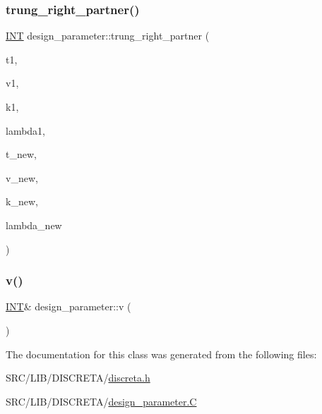 \subsubsection{\texorpdfstring{trung\+\_\+right\+\_\+partner()}{trung\_right\_partner()}}
{\footnotesize\ttfamily \mbox{\hyperlink{galois_8h_a09fddde158a3a20bd2dcadb609de11dc}{I\+NT}} design\+\_\+parameter\+::trung\+\_\+right\+\_\+partner (\begin{DoxyParamCaption}\item[{\mbox{\hyperlink{galois_8h_a09fddde158a3a20bd2dcadb609de11dc}{I\+NT}} \&}]{t1,  }\item[{\mbox{\hyperlink{galois_8h_a09fddde158a3a20bd2dcadb609de11dc}{I\+NT}} \&}]{v1,  }\item[{\mbox{\hyperlink{galois_8h_a09fddde158a3a20bd2dcadb609de11dc}{I\+NT}} \&}]{k1,  }\item[{\mbox{\hyperlink{classdiscreta__base}{discreta\+\_\+base}} \&}]{lambda1,  }\item[{\mbox{\hyperlink{galois_8h_a09fddde158a3a20bd2dcadb609de11dc}{I\+NT}} \&}]{t\+\_\+new,  }\item[{\mbox{\hyperlink{galois_8h_a09fddde158a3a20bd2dcadb609de11dc}{I\+NT}} \&}]{v\+\_\+new,  }\item[{\mbox{\hyperlink{galois_8h_a09fddde158a3a20bd2dcadb609de11dc}{I\+NT}} \&}]{k\+\_\+new,  }\item[{\mbox{\hyperlink{classdiscreta__base}{discreta\+\_\+base}} \&}]{lambda\+\_\+new }\end{DoxyParamCaption})}

\mbox{\label{classdesign__parameter_a4fb1a94211c5a14072a459038b87a3ed}} 
\subsubsection{\texorpdfstring{v()}{v()}}
{\footnotesize\ttfamily \mbox{\hyperlink{galois_8h_a09fddde158a3a20bd2dcadb609de11dc}{I\+NT}}\& design\+\_\+parameter\+::v (\begin{DoxyParamCaption}{ }\end{DoxyParamCaption})\hspace{0.3cm}{\ttfamily [inline]}}



The documentation for this class was generated from the following files\+:\begin{DoxyCompactItemize}
\item 
S\+R\+C/\+L\+I\+B/\+D\+I\+S\+C\+R\+E\+T\+A/\mbox{\hyperlink{discreta_8h}{discreta.\+h}}\item 
S\+R\+C/\+L\+I\+B/\+D\+I\+S\+C\+R\+E\+T\+A/\mbox{\hyperlink{design__parameter_8_c}{design\+\_\+parameter.\+C}}\end{DoxyCompactItemize}
